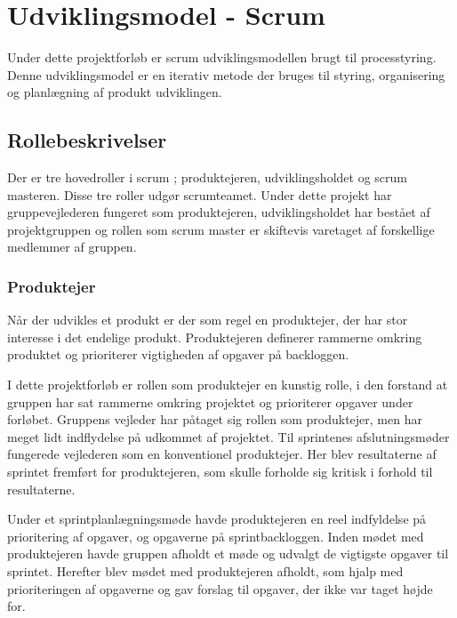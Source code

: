 \chapter{Udviklingsmodel - Scrum}
Under dette projektforløb er scrum udviklingsmodellen brugt til processtyring. Denne udviklingsmodel er en iterativ metode der bruges til styring, organisering og planlægning af produkt udviklingen.


\section{Rollebeskrivelser}
Der er tre hovedroller i scrum \cite{scrumGuides}; produktejeren, udviklingsholdet og scrum masteren. Disse tre roller udgør scrumteamet. Under dette projekt har gruppevejlederen fungeret som produktejeren, udviklingsholdet har bestået af projektgruppen og rollen som scrum master er skiftevis varetaget af forskellige medlemmer af gruppen.

\subsection{Produktejer}
Når der udvikles et produkt er der som regel en produktejer, der har stor interesse i det endelige produkt. Produktejeren definerer rammerne omkring produktet og prioriterer vigtigheden af opgaver på backloggen. \cite{scrumGuides} \newline

\noindent I dette projektforløb er rollen som produktejer en kunstig rolle, i den forstand at gruppen har sat rammerne omkring projektet og prioriterer opgaver under forløbet. Gruppens vejleder har påtaget sig rollen som produktejer, men har meget lidt indflydelse på udkommet af projektet. Til sprintenes afslutningsmøder fungerede vejlederen som en konventionel produktejer. Her blev resultaterne af sprintet fremført for produktejeren, som skulle forholde sig kritisk i forhold til resultaterne.\newline 

\noindent Under et sprintplanlægningsmøde havde produktejeren en reel indfyldelse på prioritering af opgaver, og opgaverne på sprintbackloggen. Inden mødet med produktejeren havde gruppen afholdt et møde og udvalgt de vigtigste opgaver til sprintet. Herefter blev mødet med produktejeren afholdt, som hjalp med prioriteringen af opgaverne og gav forslag til opgaver, der ikke var taget højde for.  \newline 

